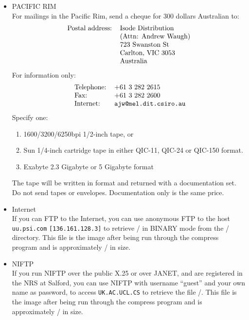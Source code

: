 \begin{itemize}
\item	PACIFIC RIM\\
For mailings in the Pacific Rim,
send a cheque for 300 dollars Australian to:  
\[\begin{tabular}{ll}
Postal address:&	Isode Distribution\\
&			(Attn: Andrew Waugh)\\
&			723 Swanston St\\
&			Carlton, VIC 3053\\
&			Australia
\end{tabular}\]
For information only:
\[\begin{tabular}{ll}
\ Telephone:&		+61 3 282 2615\\
\ Fax:&			+61 3 282 2600\\
\ Internet:&		\verb"ajw@mel.dit.csiro.au"
\end{tabular}\]
Specify one:
\begin{enumerate}
\item	1600/3200/6250bpi 1/2-inch tape, or

\item	Sun 1/4-inch cartridge tape in either QIC-11, QIC-24 or QIC-150 format.

\item	Exabyte 2.3 Gigabyte or 5 Gigabyte format

\end{enumerate}
The tape will be written in  format and returned with a documentation set.
Do not send tapes or envelopes.
Documentation only is the same price.

\item	Internet\\
If you can FTP to the Internet,
you can use anonymous FTP to the host \verb"uu.psi.com"
\verb"[136.161.128.3]"
to retrieve \compressfile/ in BINARY mode from the \tarplace/ directory.
This file is the  image after being run through the compress program
and is approximately \compressize/ in size.

\item	NIFTP\\
If you run NIFTP over the public X.25 or over JANET, and are
registered in the NRS at Salford, you can use NIFTP with username
``guest'' and your own name as password, to access \verb"UK.AC.UCL.CS" to
retrieve the file \ukcompressfile/.
This file is the  image after being run through the compress program
and is approximately \compressize/ in size.


\end{itemize}
